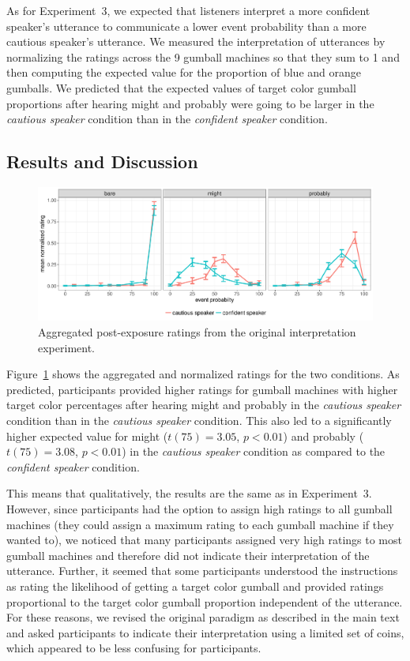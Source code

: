 \documentclass[man, floatsintext]{apa6}
\begin{document}
As for Experiment~3, we expected that listeners interpret a more confident speaker's utterance 
to communicate a lower event probability than a more cautious speaker's utterance. We measured
the interpretation of utterances by normalizing the ratings across the 9 gumball machines so that they sum to
1 and then computing the expected value for the proportion of blue and orange gumballs. 
We predicted that the expected values of target color gumball proportions after hearing {\sc might} and {\sc probably} 
were going to be larger in the \emph{cautious speaker} condition than in the \emph{confident speaker} condition.

\subsection{Results and Discussion}

\begin{figure}[h!]
\includegraphics[width=\textwidth]{plots/exp-2-ratings.pdf}
\caption{Aggregated post-exposure ratings from the original interpretation experiment.  \label{fig:adaptation-results-comp-orig}}
\end{figure}

Figure~\ref{fig:adaptation-results-comp-orig} shows the aggregated and normalized ratings for the two conditions.  As predicted, participants provided higher ratings for gumball machines with higher target color percentages after hearing {\sc might} and {\sc probably} in the \emph{cautious speaker} condition than in the \emph{cautious speaker} condition. This also led to a significantly higher expected value for {\sc might} ($t(75)=3.05$, $p<0.01$) and {\sc probably} ($t(75)=3.08$, $p<0.01$) in the \emph{cautious speaker} condition as compared to the \emph{confident speaker} condition.

This means that qualitatively, the results are the same as in Experiment~3. However, since participants had the option to assign high 
ratings to 
all gumball machines (they could assign a maximum rating to each gumball machine if they wanted to), we noticed that many participants assigned very high ratings to most gumball 
machines and therefore did not indicate their interpretation of the utterance. Further, it seemed that some participants
understood the instructions as rating the likelihood of getting a target color gumball and provided ratings proportional to the 
target color gumball proportion independent of the utterance. For these reasons, we revised the original paradigm as described
in the main text and asked participants to indicate their interpretation using a limited set of coins, which appeared to be less
confusing for participants. 
\end{document}
